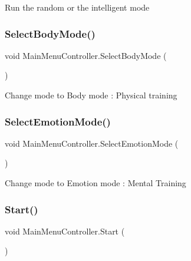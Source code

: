 Run the random or the intelligent mode \mbox{\label{class_main_menu_controller_a642c1d5d2362568dc849f4fabe4f4a40}} 
\subsubsection{\texorpdfstring{Select\+Body\+Mode()}{SelectBodyMode()}}
{\footnotesize\ttfamily void Main\+Menu\+Controller.\+Select\+Body\+Mode (\begin{DoxyParamCaption}{ }\end{DoxyParamCaption})}

Change mode to Body mode \+: Physical training \mbox{\label{class_main_menu_controller_a406ca67e38b2bc06b58afa93c16324ec}} 
\subsubsection{\texorpdfstring{Select\+Emotion\+Mode()}{SelectEmotionMode()}}
{\footnotesize\ttfamily void Main\+Menu\+Controller.\+Select\+Emotion\+Mode (\begin{DoxyParamCaption}{ }\end{DoxyParamCaption})}

Change mode to Emotion mode \+: Mental Training \mbox{\label{class_main_menu_controller_a732c505767ad16e6f4726f0e9643fa8a}} 
\subsubsection{\texorpdfstring{Start()}{Start()}}
{\footnotesize\ttfamily void Main\+Menu\+Controller.\+Start (\begin{DoxyParamCaption}{ }\end{DoxyParamCaption})\hspace{0.3cm}{\ttfamily [private]}}


